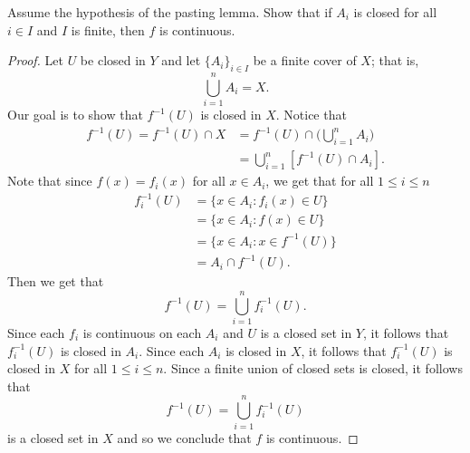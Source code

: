 \documentclass[a4paper]{article}
\begin{document}
\begin{problem}
   Assume the hypothesis of the pasting lemma. Show that if \( {A}_{i} \) is closed for all \( i \in I  \) and \( I  \) is finite, then \( f  \) is continuous. 
\end{problem}
\begin{proof}
    Let \( U  \) be closed in \( Y  \) and let \( \{ {A}_{i} \}_{i \in I} \) be a finite cover of \( X  \); that is,
            \[  \bigcup_{ i = 1  }^{ n }  {A}_{i} = X. \]
    Our goal is to show that \( f^{-1}(U) \) is closed in \( X  \). Notice that 
\begin{align*}
    f^{-1}(U) = f^{-1}(U) \cap X &= f^{-1}(U) \cap \Big( \bigcup_{ i=1  }^{ n }  {A}_{i} \Big)  \\
                                 &= \bigcup_{ i= 1  }^{ n  }  [f^{-1}(U) \cap {A}_{i}].
\end{align*}
Note that since \( f(x) = {f}_{i}(x)  \) for all \( x \in {A}_{i} \), we get that for all \( 1 \leq i \leq n  \)
\begin{align*}
    {f}_{i}^{-1}(U) &= \{ x \in {A}_{i} : {f}_{i}(x) \in U  \}  \\
                    &= \{ x \in {A}_{i} : f(x) \in U  \}  \\
                    &= \{ x \in {A}_{i} : x \in f^{-1}(U) \}  \\
                    &= {A}_{i} \cap f^{-1}(U).
\end{align*}
Then we get that 
\[  f^{-1}(U) = \bigcup_{ i=1  }^{ n }  f^{-1}_i (U). \]
Since each \( {f}_{i} \) is continuous on each \( {A}_{i} \) and \( U \) is a closed set in \( Y \),  it follows that \( {f}_{i}^{-1}(U) \) is closed in \( {A}_{i} \). Since each \( {A}_{i} \) is closed in \( X  \), it follows that \( {f}_{i}^{-1}(U) \) is closed in \( X  \) for all \( 1 \leq i \leq n  \). Since a finite union of closed sets is closed, it follows that 
\[  f^{-1}(U) = \bigcup_{ i= 1  }^{ n }  f^{-1}_i(U) \]
is a closed set in \( X  \) and so we conclude that \( f \) is continuous.
\end{proof}
\end{document}
